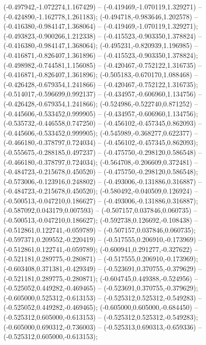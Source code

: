  (-0.497942,-1.072274,1.167429) -- (-0.419469,-1.070119,1.329271) -- (-0.424890,-1.162778,1.261183);
 (-0.494718,-0.983646,1.202578) -- (-0.416380,-0.984147,1.368064) -- (-0.419469,-1.070119,1.329271);
 (-0.493823,-0.900266,1.212338) -- (-0.415523,-0.903350,1.378824) -- (-0.416380,-0.984147,1.368064);
 (-0.495231,-0.820939,1.196985) -- (-0.416871,-0.826407,1.361896) -- (-0.415523,-0.903350,1.378824);
 (-0.498982,-0.744581,1.156085) -- (-0.420467,-0.752122,1.316735) -- (-0.416871,-0.826407,1.361896);
 (-0.505183,-0.670170,1.088468) -- (-0.426428,-0.679354,1.241866) -- (-0.420467,-0.752122,1.316735);
 (-0.514017,-0.596699,0.992137) -- (-0.434957,-0.606960,1.134756) -- (-0.426428,-0.679354,1.241866);
 (-0.524986,-0.522740,0.871252) -- (-0.445606,-0.533452,0.999905) -- (-0.434957,-0.606960,1.134756);
 (-0.535732,-0.446558,0.747250) -- (-0.456102,-0.457345,0.862093) -- (-0.445606,-0.533452,0.999905);
 (-0.545989,-0.368277,0.622377) -- (-0.466180,-0.378797,0.724034) -- (-0.456102,-0.457345,0.862093);
 (-0.555675,-0.288185,0.497237) -- (-0.475750,-0.298120,0.586548) -- (-0.466180,-0.378797,0.724034);
 (-0.564708,-0.206609,0.372481) -- (-0.484723,-0.215678,0.450520) -- (-0.475750,-0.298120,0.586548);
 (-0.573006,-0.123916,0.248802) -- (-0.493006,-0.131886,0.316887) -- (-0.484723,-0.215678,0.450520);
 (-0.580492,-0.040509,0.126924) -- (-0.500513,-0.047210,0.186627) -- (-0.493006,-0.131886,0.316887);
 (-0.587092,0.043179,0.007593) -- (-0.507157,0.037846,0.060735) -- (-0.500513,-0.047210,0.186627);
 (-0.592738,0.126692,-0.108438) -- (-0.512861,0.122741,-0.059789) -- (-0.507157,0.037846,0.060735);
 (-0.597371,0.209552,-0.220419) -- (-0.517555,0.206910,-0.173969) -- (-0.512861,0.122741,-0.059789);
 (-0.600941,0.291277,-0.327622) -- (-0.521181,0.289775,-0.280871) -- (-0.517555,0.206910,-0.173969);
 (-0.603408,0.371381,-0.429349) -- (-0.523691,0.370755,-0.379629) -- (-0.521181,0.289775,-0.280871);
 (-0.604745,0.449388,-0.524956) -- (-0.525052,0.449282,-0.469465) -- (-0.523691,0.370755,-0.379629);
 (-0.605000,0.525312,-0.613153) -- (-0.525312,0.525312,-0.549283) -- (-0.525052,0.449282,-0.469465);
 (-0.605000,0.605000,-0.684450) -- (-0.525312,0.605000,-0.613153) -- (-0.525312,0.525312,-0.549283);
 (-0.605000,0.690312,-0.736003) -- (-0.525313,0.690313,-0.659336) -- (-0.525312,0.605000,-0.613153);
